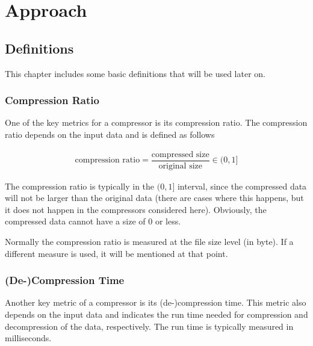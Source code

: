 \chapter{Approach}\label{ch:approach}

\section{Definitions}\label{sec:definitions}

This chapter includes some basic definitions that will be used later on.

\subsection{Compression Ratio}

One of the key metrics for a compressor is its compression ratio. The compression ratio depends on the input data and is defined as follows

\begin{align*}
\text{compression ratio} = \dfrac{\text{compressed size}}{\text{original size}} \in (0,1]
\end{align*}

The compression ratio is typically in the $(0,1]$ interval, since the compressed data will not be larger than the original data (there are cases where this happens, but it does not happen in the compressors considered here). Obviously, the compressed data cannot have a size of 0 or less.

Normally the compression ratio is measured at the file size level (in byte). If a different measure is used, it will be mentioned at that point.

\subsection{(De-)Compression Time}

Another key metric of a compressor is its (de-)compression time. This metric also depends on the input data and indicates the run time needed for compression and decompression of the data, respectively. The run time is typically measured in milliseconds.

